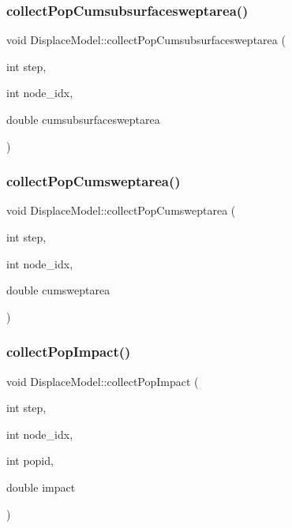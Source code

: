 \mbox{\label{class_displace_model_a8e2316a942cb82ba2b17542c9a18c34e}} 
\subsubsection{\texorpdfstring{collectPopCumsubsurfacesweptarea()}{collectPopCumsubsurfacesweptarea()}}
{\footnotesize\ttfamily void Displace\+Model\+::collect\+Pop\+Cumsubsurfacesweptarea (\begin{DoxyParamCaption}\item[{int}]{step,  }\item[{int}]{node\+\_\+idx,  }\item[{double}]{cumsubsurfacesweptarea }\end{DoxyParamCaption})}

\mbox{\label{class_displace_model_a3440b42da4f1ac019a323822efbf974b}} 
\subsubsection{\texorpdfstring{collectPopCumsweptarea()}{collectPopCumsweptarea()}}
{\footnotesize\ttfamily void Displace\+Model\+::collect\+Pop\+Cumsweptarea (\begin{DoxyParamCaption}\item[{int}]{step,  }\item[{int}]{node\+\_\+idx,  }\item[{double}]{cumsweptarea }\end{DoxyParamCaption})}

\mbox{\label{class_displace_model_aa8a30771fb739029da32897b91ffa3cb}} 
\subsubsection{\texorpdfstring{collectPopImpact()}{collectPopImpact()}}
{\footnotesize\ttfamily void Displace\+Model\+::collect\+Pop\+Impact (\begin{DoxyParamCaption}\item[{int}]{step,  }\item[{int}]{node\+\_\+idx,  }\item[{int}]{popid,  }\item[{double}]{impact }\end{DoxyParamCaption})}

